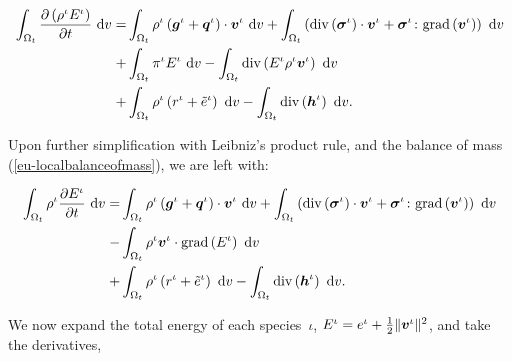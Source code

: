 \begin{equation*}
\begin{split}
\int_{\Omega_{t}}
\frac{\partial \left(\rho^{\iota}
E^{\iota}\right)}{\partial t}  \ \mathrm{d}v  = & \int_{\Omega_{t}}
  \rho^{\iota} \left(\mbox{\boldmath$ g$}^{\iota} +
  \mbox{\boldmath$ q$}^{\iota}\right)\cdot\mbox{\boldmath$ v$}^{\iota}\ \mathrm{d}v +
\int_{\Omega_{t}}
  \left(\mathrm{div}\left(\mbox{\boldmath$\sigma$}^{\iota}\right)\cdot\mbox{\boldmath$ v$}^{\iota} +
  \mbox{\boldmath$\sigma$}^{\iota}\colon\mathrm{grad}\left(\mbox{\boldmath$ v$}^{\iota}\right)
  \right)\ \mathrm{d}v\\ + 
& \int_{\Omega_{t}} \pi^{\iota}E^{\iota}\ \mathrm{d}v
- \int_{\Omega_{t}} \mathrm{div}\left(E^{\iota} \rho^{\iota}
\mbox{\boldmath$ v$}^{\iota}\right)\ \mathrm{d}v
\\  + &\int_{\Omega_{t}} \rho^{\iota} \left(r^{\iota} +
  \tilde{e}^{\iota} \right)\ \mathrm{d}v
- \int_{\Omega_{t}}
  \mathrm{div}\left(\mbox{\boldmath$ h$}^{\iota}\right)\ \mathrm{d}v.
\end{split}
\end{equation*}

\noindent Upon further simplification with Leibniz's product rule, and
the balance of mass (\ref{eu-localbalanceofmass}), we are left with:

\begin{equation*}
\begin{split}
\int_{\Omega_{t}}
\rho^{\iota} \frac{\partial E^{\iota}}{\partial t}\ \mathrm{d}v  = & \int_{\Omega_{t}}
  \rho^{\iota} \left(\mbox{\boldmath$ g$}^{\iota} +
  \mbox{\boldmath$ q$}^{\iota}\right)\cdot\mbox{\boldmath$ v$}^{\iota}\ \mathrm{d}v +
\int_{\Omega_{t}}
  \left(\mathrm{div}\left(\mbox{\boldmath$\sigma$}^{\iota}\right)\cdot\mbox{\boldmath$ v$}^{\iota} +
  \mbox{\boldmath$\sigma$}^{\iota}\colon\mathrm{grad}\left(\mbox{\boldmath$ v$}^{\iota}\right)
  \right)\ \mathrm{d}v\\ 
 - & \int_{\Omega_{t}} \rho^{\iota}\mbox{\boldmath$ v$}^{\iota}
\cdot \mathrm{grad}\left( E^{\iota} \right)\ \mathrm{d}v
\\  + &\int_{\Omega_{t}} \rho^{\iota} \left(r^{\iota} +
  \tilde{e}^{\iota} \right)\ \mathrm{d}v
- \int_{\Omega_{t}}
  \mathrm{div}\left(\mbox{\boldmath$ h$}^{\iota}\right)\ \mathrm{d}v.
\end{split}
\end{equation*}

We now expand the total energy of each species~$\iota$, $E^{\iota} =
e^\iota + \frac{1}{2} \Vert\mbox{\boldmath$ v$}^\iota\Vert^2$, and take the
derivatives,

